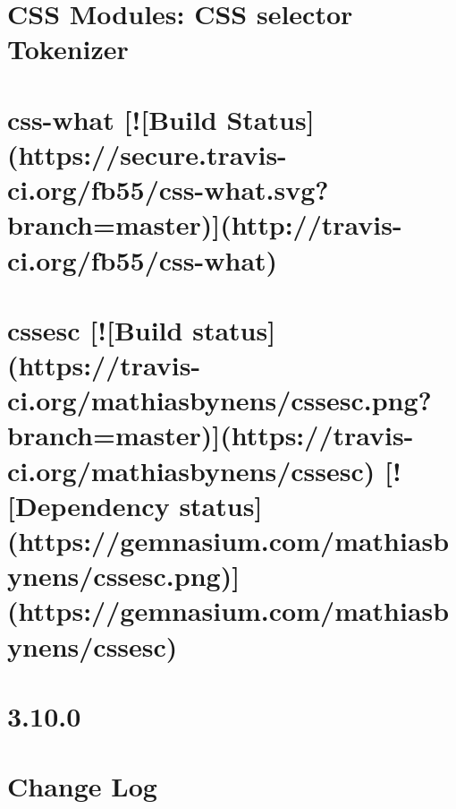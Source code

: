 \documentclass[twoside]{book}
\newcommand{\+}{\discretionary{\mbox{\scriptsize$\hookleftarrow$}}{}{}}
\begin{document}
\chapter{C\+SS Modules\+: C\+SS selector Tokenizer}
\label{md__c_1_workspace_demo_src_main_script_node_modules_css-selector-tokenizer__r_e_a_d_m_e}

\chapter{css-\/what \mbox{[}!\mbox{[}Build Status\mbox{]}(https\+://secure.travis-\/ci.org/fb55/css-\/what.svg?branch=master)\mbox{]}(http\+://travis-\/ci.org/fb55/css-\/what)}
\label{md__c_1_workspace_demo_src_main_script_node_modules_css-what_readme}

\chapter{cssesc \mbox{[}!\mbox{[}Build status\mbox{]}(https\+://travis-\/ci.org/mathiasbynens/cssesc.png?branch=master)\mbox{]}(https\+://travis-\/ci.org/mathiasbynens/cssesc) \mbox{[}!\mbox{[}Dependency status\mbox{]}(https\+://gemnasium.com/mathiasbynens/cssesc.png)\mbox{]}(https\+://gemnasium.com/mathiasbynens/cssesc)}
\label{md__c_1_workspace_demo_src_main_script_node_modules_cssesc__r_e_a_d_m_e}

\chapter{3.10.0}
\label{md__c_1_workspace_demo_src_main_script_node_modules_cssnano__c_h_a_n_g_e_l_o_g}

\chapter{Change Log}
\label{md__c_1_workspace_demo_src_main_script_node_modules_cssnano_node_modules_autoprefixer__c_h_a_n_g_e_l_o_g}

\end{document}
